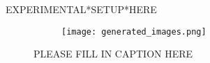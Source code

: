 EXPERIMENTAL*SETUP*HERE

\begin{figure}[t]
	\centering
	\begin{subfigure}{0.9\textwidth}
		\texttt{[image: generated\_images.png]}
		\label{fig:diffusion-samples}
	\end{subfigure}
	\caption{PLEASE FILL IN CAPTION HERE}
	\label{fig:first_figure}
\end{figure}